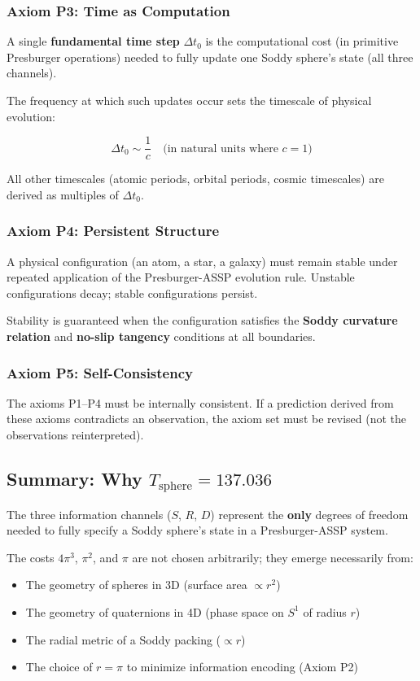 \documentclass[11pt,a4paper]{article}
\begin{document}
  \subsubsection{Axiom P3: Time as Computation}

  A single \textbf{fundamental time step} $\Delta t_0$ is the computational cost (in primitive Presburger operations) needed to fully update one Soddy sphere's state (all three channels).

  The frequency at which such updates occur sets the timescale of physical evolution:

  \[
  \Delta t_0 \sim \frac{1}{c} \quad \text{(in natural units where } c = 1\text{)}
  \]

  All other timescales (atomic periods, orbital periods, cosmic timescales) are derived as multiples of $\Delta t_0$.

  \subsubsection{Axiom P4: Persistent Structure}

  A physical configuration (an atom, a star, a galaxy) must remain stable under repeated application of the Presburger-ASSP evolution rule. Unstable configurations decay; stable configurations persist.

  Stability is guaranteed when the configuration satisfies the \textbf{Soddy curvature relation} and \textbf{no-slip tangency} conditions at all boundaries.

  \subsubsection{Axiom P5: Self-Consistency}

  The axioms P1–P4 must be internally consistent. If a prediction derived from these axioms contradicts an observation, the axiom set must be revised (not the observations reinterpreted).

  \subsection{Summary: Why $T_{\text{sphere}} = 137.036$}

  The three information channels ($S$, $R$, $D$) represent the \textbf{only} degrees of freedom needed to fully specify a Soddy sphere's state in a Presburger-ASSP system.

  The costs $4\pi^3$, $\pi^2$, and $\pi$ are not chosen arbitrarily; they emerge necessarily from:
  \begin{itemize}
  \item The geometry of spheres in 3D (surface area $\propto r^2$)
  \item The geometry of quaternions in 4D (phase space on $S^1$ of radius $r$)
  \item The radial metric of a Soddy packing ($\propto r$)
  \item The choice of $r = \pi$ to minimize information encoding (Axiom P2)
  \end{itemize}
\end{document}
